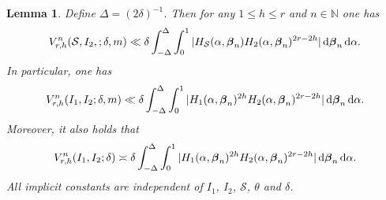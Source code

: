 \documentclass[11pt,reqno]{amsart}
\newtheorem{lemma}{Lemma}[section]
\numberwithin{equation}{section}
\renewcommand{\d}{\,{\rm d}}
\begin{document}
\begin{lemma} \label{lem:poulcount}
Define $\Delta = (2\delta)^{-1}$. Then for any $1\leq h \leq r$ and $n \in \mathbb{N}$ one has 
\[ V_{r,h}^n(\mathcal{S}, I_2,;\delta,m) \ll \delta \int_{-\Delta}^{\Delta} \int_0^1 |H_{\mathcal{S}}(\alpha,\boldsymbol{\beta}_n)H_2(\alpha,\boldsymbol{\beta}_n)^{2r-2h}| \d \boldsymbol{\beta}_n \d \alpha. \]
In particular, one has 
\[ V_{r,h}^n(I_1, I_2; \delta,m) \ll \delta \int_{-\Delta}^{\Delta} \int_0^1 |H_1(\alpha,\boldsymbol{\beta}_n)^{2h} H_2(\alpha,\boldsymbol{\beta}_n)^{2r-2h}| \d \boldsymbol{\beta}_n \d \alpha. \]
Moreover, it also holds that 
\[ V_{r,h}^n(I_1, I_2; \delta) \asymp \delta \int_{-\Delta}^{\Delta} \int_0^1 |H_1(\alpha,\boldsymbol{\beta}_n)^{2h} H_2(\alpha,\boldsymbol{\beta}_n)^{2r-2h}| \d \boldsymbol{\beta}_n \d \alpha. \]
All implicit constants are independent of $I_1$, $I_2$, $\mathcal{S}$, $\theta$ and $\delta$. 
\end{lemma}
\end{document}
